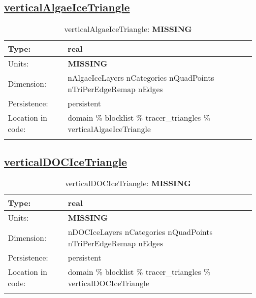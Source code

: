 \subsection[verticalAlgaeIceTriangle]{\hyperref[sec:var_tab_tracer_triangles]{verticalAlgaeIceTriangle}}
\label{subsec:var_sec_tracer_triangles_verticalAlgaeIceTriangle}
\begin{center}
\begin{longtable}{| p{2.0in} | p{4.0in} |}
        \hline 
        Type: & real \\
        \hline 
        Units: & {\bf \color{red} MISSING} \\
        \hline 
        Dimension: & nAlgaeIceLayers nCategories nQuadPoints nTriPerEdgeRemap nEdges \\
        \hline 
        Persistence: & persistent \\
        \hline 
         Location in code: & domain \% blocklist \% tracer\_triangles \% verticalAlgaeIceTriangle \\
         \hline 
    \caption{verticalAlgaeIceTriangle: {\bf \color{red} MISSING}}
\end{longtable}
\end{center}
\subsection[verticalDOCIceTriangle]{\hyperref[sec:var_tab_tracer_triangles]{verticalDOCIceTriangle}}
\label{subsec:var_sec_tracer_triangles_verticalDOCIceTriangle}
\begin{center}
\begin{longtable}{| p{2.0in} | p{4.0in} |}
        \hline 
        Type: & real \\
        \hline 
        Units: & {\bf \color{red} MISSING} \\
        \hline 
        Dimension: & nDOCIceLayers nCategories nQuadPoints nTriPerEdgeRemap nEdges \\
        \hline 
        Persistence: & persistent \\
        \hline 
         Location in code: & domain \% blocklist \% tracer\_triangles \% verticalDOCIceTriangle \\
         \hline 
    \caption{verticalDOCIceTriangle: {\bf \color{red} MISSING}}
\end{longtable}
\end{center}
